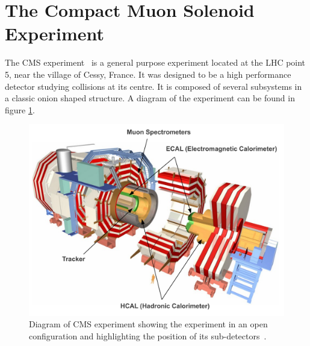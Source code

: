 \section{The Compact Muon Solenoid Experiment}
\label{SECTION:ExperimentalApparatus_CMS}


The \acrfull{CMS} experiment~\cite{ARTICLE:TheCMSExperiment} is a general purpose experiment located at the \gls{LHC} point 5, near the village of Cessy, France. It was designed to be a high performance detector studying collisions at its centre. It is composed of several subsystems in a classic onion shaped structure. A diagram of the experiment can be found in figure \ref{FIGURE:ExperimentalApparatus_CMS_Layout_Diagram}.

\begin{figure}[!htb]
  \centering
  \includegraphics[width=1.00\textwidth]{Chapter02/CMS/Images/CMS_Layout_Diagram.pdf}
  \caption[Diagram of CMS experiment showing the experiment in an open configuration and highlighting the position of its sub-detectors.]
  {Diagram of \gls{CMS} experiment showing the experiment in an open configuration and highlighting the position of its sub-detectors~\cite{IMAGEREF:CERNPublic_CMSDiagram}.}
  \label{FIGURE:ExperimentalApparatus_CMS_Layout_Diagram}
\end{figure}

